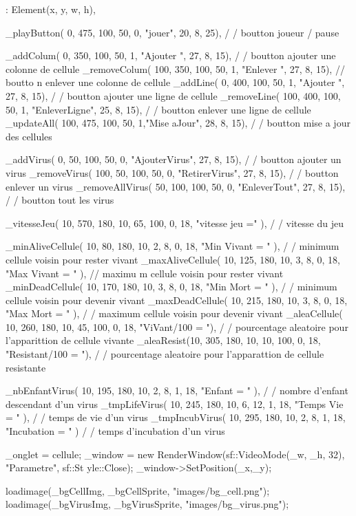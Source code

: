 \begin{DoxyCode}
: Element(x, y, w, h), 


_playButton( 0, 475, 100, 50, 0, "jouer", 20, 8, 25),                                   /
      / boutton joueur / pause

_addColum( 0, 350, 100, 50, 1, "Ajouter \nColonne", 27, 8, 15),                 /
      / boutton ajouter une colonne de cellule
_removeColum( 100, 350, 100, 50, 1, "Enlever \nColonne", 27, 8, 15),    // boutto
      n enlever une colonne de cellule
_addLine( 0, 400, 100, 50, 1, "Ajouter  \nLigne", 27, 8, 15),                   /
      / boutton ajouter une ligne de cellule
_removeLine( 100, 400, 100, 50, 1, "Enlever\n  Ligne", 25, 8, 15),              /
      / boutton enlever une ligne de cellule
_updateAll( 100, 475, 100, 50, 1,"Mise a\n Jour", 28, 8, 15),                   /
      / boutton mise a jour des cellules

_addVirus( 0, 50, 100, 50, 0, "Ajouter\n Virus", 27, 8, 15),                    /
      / boutton ajouter un virus
_removeVirus( 100, 50, 100, 50, 0, "Retirer\n Virus", 27, 8, 15),               /
      / boutton enlever un virus
_removeAllVirus( 50, 100, 100, 50, 0, "Enlever\n Tout", 27, 8, 15),             /
      / boutton tout les virus        


_vitesseJeu( 10, 570, 180, 10, 65, 100, 0, 18, "vitesse jeu =" ),               /
      / vitesse du jeu
        
_minAliveCellule( 10, 80, 180, 10, 2, 8, 0, 18, "Min Vivant = " ),              /
      / minimum cellule voisin pour rester vivant
_maxAliveCellule( 10, 125, 180, 10, 3, 8, 0, 18, "Max Vivant = " ),     // maximu
      m cellule voisin pour rester vivant
_minDeadCellule( 10, 170, 180, 10, 3, 8, 0, 18, "Min Mort = " ),                /
      / minimum cellule voisin pour devenir vivant
_maxDeadCellule( 10, 215, 180, 10, 3, 8, 0, 18, "Max Mort = " ),                /
      / maximum cellule voisin pour devenir vivant
_aleaCellule( 10, 260, 180, 10, 45, 100, 0, 18, "ViVant/100 = "),               /
      / pourcentage aleatoire pour l'apparittion de cellule vivante
_aleaResist(10, 305, 180, 10, 10, 100, 0, 18, "Resistant/100 = "),              /
      / pourcentage aleatoire pour l'apparattion de cellule resistante

_nbEnfantVirus( 10, 195, 180, 10, 2, 8, 1, 18, "Enfant = " ),                   /
      / nombre d'enfant descendant d'un virus
_tmpLifeVirus( 10, 245, 180, 10, 6, 12, 1, 18, "Temps Vie = "  ),               /
      / temps de vie d'un virus
_tmpIncubVirus( 10, 295, 180, 10, 2, 8, 1, 18, "Incubation = " )                /
      / temps d'incubation d'un virus

{
        _onglet = cellule;
        _window = new RenderWindow(sf::VideoMode(_w, _h, 32), "Parametre", sf::St
      yle::Close);
        _window->SetPosition(_x,_y);
        
        loadimage(_bgCellImg, _bgCellSprite, "images/bg_cell.png");
        loadimage(_bgVirusImg, _bgVirusSprite, "images/bg_virus.png");  
}
\end{DoxyCode}
